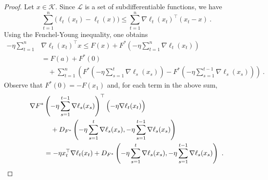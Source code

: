 \documentclass[11pt]{hackednow}
\newcommand{\cL}{\mathcal{L}}
\newcommand{\cK}{\mathcal{K}}
\begin{document}
\begin{proof}
Let $x \in \cK$. Since $\cL$ is a set of subdifferentiable functions, we have
$$\sum_{t=1}^n \bigl( \ell_t(x_t) - \ell_t(x) \bigr) \leq \sum_{t=1}^n \nabla \ell_t(x_t)^{\top} (x_t -x)~.$$ Using the Fenchel-Young inequality, one obtains
\begin{align*}
- \eta \sum_{t=1}^n &\nabla \ell_t(x_t)^{\top} x
\leq
    F(x) + F^*\left( - \eta \sum_{t=1}^{n} \nabla \ell_t(x_t) \right)
\\&=
    F(a) + F^*(0) \\ & \quad + \sum_{t=1}^n \left( F^*\left( - \eta \sum_{s=1}^{t} \nabla \ell_s(x_s)\right)  - F^*\left( - \eta \sum_{s=1}^{t-1} \nabla \ell_s(x_s)\right) \right)~.
\end{align*}
Observe that $F^*(0)= - F(x_1)$ and, for each term in the above sum,
\begin{align*}
    \nabla F^*&\left( - \eta \sum_{s=1}^{t-1} \nabla \ell_s(x_s) \right)^{\top} \Bigl(- \eta \nabla \ell_t(x_t)\Bigr)
\\& \quad
    + D_{F^*}\left(- \eta \sum_{s=1}^{t} \nabla \ell_s(x_s), - \eta \sum_{s=1}^{t-1} \nabla \ell_s(x_s)\right)
\\ &=
    - \eta x_t^{\top} \nabla \ell_t(x_t) + D_{F^*}\left(- \eta \sum_{s=1}^{t} \nabla \ell_s(x_s), - \eta \sum_{s=1}^{t-1} \nabla \ell_s(x_s) \right)~.
\end{align*}
\end{proof}
\end{document}
